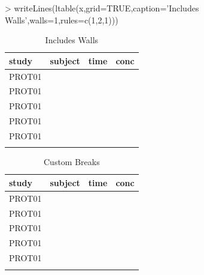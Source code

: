 \documentclass[titlepage]{article}
\begin{document}
\begin{Schunk}
\begin{Sinput}
> writeLines(ltable(x,grid=TRUE,caption='Includes Walls',walls=1,rules=c(1,2,1)))
\end{Sinput}
\begin{table}[!htpb]
 \caption[Includes Walls]{Includes Walls }
 \begin{center}
  \begin{tabular}{|l|r|r|r|}
    \hline
   study & subject & time & conc \\ \hline \hline
   PROT01 & \verb#1001# & \verb#0# & \verb#0.12# \\ \hline
   PROT01 & \verb#1001# & \verb#1# & \verb#34.00# \\ \hline
   PROT01 & \verb#1001# & \verb#2# & \verb#5.60# \\ \hline
   PROT01 & \verb#1002# & \verb#0# & \verb#0.50# \\ \hline
   PROT01 & \verb#1002# & \verb#1# & \verb#200.00# \\ \hline
    & \verb#1002# & \verb#2# & \verb## \\ \hline
  \end{tabular}
 \end{center}
\end{table}\end{Schunk}
\begin{Schunk}
\begin{table}[!htpb]
 \caption[Custom Breaks]{Custom Breaks }
 \begin{center}
  \begin{tabular}{lr||rr}
    \hline \hline
   study & subject & time & conc \\ \hline
   PROT01 & \verb#1001# & \verb#0# & \verb#0.12# \\
   PROT01 & \verb#1001# & \verb#1# & \verb#34.00# \\
   PROT01 & \verb#1001# & \verb#2# & \verb#5.60# \\ \hline
   PROT01 & \verb#1002# & \verb#0# & \verb#0.50# \\
   PROT01 & \verb#1002# & \verb#1# & \verb#200.00# \\
    & \verb#1002# & \verb#2# & \verb## \\ \hline
  \end{tabular}
 \end{center}
\end{table}\end{Schunk}
\end{document}
